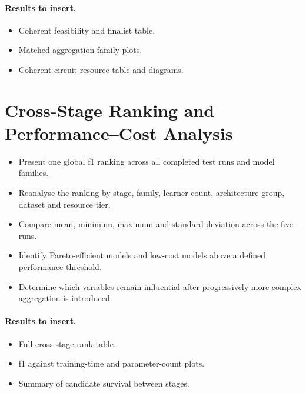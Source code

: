 \documentclass[]{UCD_CS_MSc_AAI_Report}
\newcommand{\resultplaceholder}{\paragraph{Results to insert.}}
\begin{document}
\resultplaceholder
\begin{itemize}
    \item Coherent feasibility and finalist table.
    \item Matched aggregation-family plots.
    \item Coherent circuit-resource table and diagrams.
\end{itemize}

\section{Cross-Stage Ranking and Performance--Cost Analysis}
\label{sec:results-cross-stage}
\begin{itemize}
    \item Present one global \acl{f1} ranking across all completed test runs and model families.
    \item Reanalyse the ranking by stage, family, learner count, architecture group, dataset and resource tier.
    \item Compare mean, minimum, maximum and standard deviation across the five runs.
    \item Identify Pareto-efficient models and low-cost models above a defined performance threshold.
    \item Determine which variables remain influential after progressively more complex aggregation is introduced.
\end{itemize}

\resultplaceholder
\begin{itemize}
    \item Full cross-stage rank table.
    \item \acl{f1} against training-time and parameter-count plots.
    \item Summary of candidate survival between stages.
\end{itemize}
\end{document}
